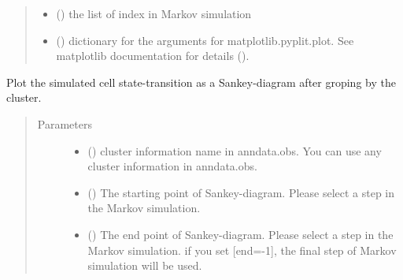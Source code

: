 \documentclass[letterpaper,10pt,english]{sphinxmanual}
\begin{document}
\begin{fulllineitems}
\begin{fulllineitems}
\begin{quote}
\begin{description}
\begin{itemize}
\item {} 
 () \textendash{} the list of index in Markov simulation

\item {} 
 () \textendash{} dictionary for the arguments for matplotlib.pyplit.plot.
See matplotlib documentation for details ().

\end{itemize}

\end{description}\end{quote}

\end{fulllineitems}


\begin{fulllineitems}
\label{\detokenize{modules/celloracle:celloracle.Oracle.plot_mc_resutls_as_sankey}}
Plot the simulated cell state-transition as a Sankey-diagram after groping by the cluster.
\begin{quote}\begin{description}
\item[{Parameters}] \leavevmode\begin{itemize}
\item {} 
 () \textendash{} cluster information name in anndata.obs.
You can use any cluster information in anndata.obs.

\item {} 
 () \textendash{} The starting point of Sankey-diagram. Please select a  step in the Markov simulation.

\item {} 
 () \textendash{} The end point of Sankey-diagram. Please select a  step in the Markov simulation.
if you set {[}end=-1{]}, the final step of Markov simulation will be used.


\end{itemize}
\end{description}
\end{quote}
\end{fulllineitems}
\end{fulllineitems}
\end{document}
